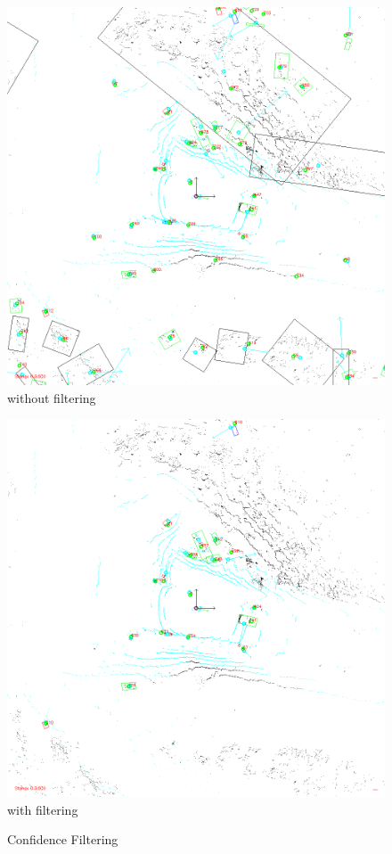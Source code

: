 \documentclass[11pt,oneside,openright]{mpreport}
\begin{document}
\begin{figure}[htb]
  \caption{Confidence Filtering} 
    \centering
    \begin{minipage}[t]{0.49\textwidth}
        \centering
          \includegraphics[width=\textwidth]{bilder/filter_off.png}
          without filtering
    \end{minipage}%
    \hfill
    \begin{minipage}[t]{0.49\textwidth}
        \centering
	\includegraphics[width=\textwidth]{bilder/filter_on.png}
	with filtering
    \end{minipage}
    \label{conf_filter}
\end{figure}
\end{document}
